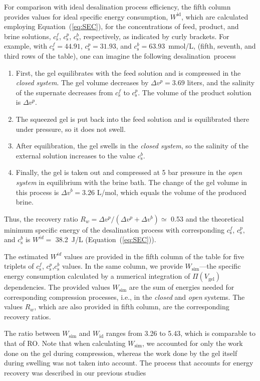 \documentclass[gels,article,accept,pdftex,moreauthors]{Definitions/mdpi}
\newcommand{\ie}{{i.e.,} }
\newcommand{\cs}{c_{\mathrm{s}}}
\newcommand{\Vgel}{V_\mathrm{gel}}
\newcommand{\Pgel}{\Pi}
\newcommand{\refeq}[1]{Equation~(\ref{#1}){}}
\providecommand{\DIFdelend}{} %
\begin{document}
For comparison with ideal desalination process efficiency, the fifth column provides values for ideal specific energy consumption, $W^\text{id}$, which are calculated employing \refeq{eq:SEC}, for the concentrations of feed, product, and brine solutions, $\cs^f$,  $\cs^p$, $\cs^b$, respectively, as indicated by curly brackets.
For example, with $\cs^f=44.91$, $\cs^p=31.93$, and $\cs^b = 63.93$~mmol/L, (fifth, seventh, and third rows of the table), one can imagine the following desalination~process
\begin{enumerate}
\item First, the gel equilibrates with the feed solution and is compressed in the \emph{closed system}.
The gel volume decreases by $\Delta v^p = 3.69$ liters, and the salinity of the supernate decreases from $\cs^f$ to $\cs^p$.
The volume of the product solution is $\Delta v^p$.
\item The squeezed gel is put back into the feed solution and is equilibrated there under pressure, so it does not swell.
\item After equilibration, the gel swells in the \emph{closed system}, so the salinity of the external solution increases to the value $\cs^b$.
\item Finally, the gel is taken out and compressed at 5 bar pressure in the \emph{open system} in equilibrium with the brine bath.
The change of the gel volume in this process is $\Delta v^b = 3.26$ L/mol, which equals the volume of the produced brine.
\end{enumerate}



\DIFdelend Thus, the recovery ratio $R_w = \Delta v^p / (\Delta v^p + \Delta v^b) \simeq $ 0.53 and the theoretical minimum specific energy of the desalination process with corresponding $\cs^f$, $\cs^p,$ and $\cs^b$ is $W^{id} =$ 38.2~J/L (\refeq{eq:SEC}).

The estimated $W^{id}$ values are provided in the fifth column of the table for five triplets of $\cs^f$, $\cs^p$,$\cs^b$ values.
In the same column, we provide $W_{\mathrm{sim}}$---the specific energy consumption calculated by a numerical integration of $\Pgel(\Vgel)$ dependencies. 
The provided values  $W_{\mathrm{sim}}$ are the sum of energies needed for corresponding compression processes, \ie in the \emph{closed} and \emph{open} systems.
The values $R_w$, which are also provided in fifth column, are the corresponding recovery ratios.

The ratio between $W_{\mathrm{sim}}$ and $W_{\mathrm{id}}$ ranges from 3.26 to 5.43, which is comparable to that of RO.
Note that when calculating $W_{\mathrm{sim}}$, we accounted for only the work done on the gel during compression, whereas the work done by the gel itself during swelling was not taken into account. 
The process that accounts for energy recovery was described in our previous studies \cite{Prokacheva2021, Rud2018} 
\end{document}
